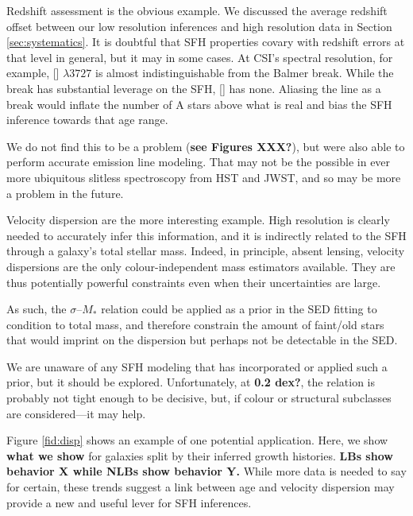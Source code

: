 \documentclass[a4paper,fleqn,usenatbib]{mnras}
\newcommand{\Mstel}{M_\ast}
\newcommand{\bfr}{\bf\color{red}}
\begin{document}
Redshift assessment is the obvious example. We discussed the average redshift offset between
our low resolution inferences and high resolution data in Section \ref{sec:systematics}. It is
doubtful that SFH properties covary with redshift errors at that level in general, but it may in 
some cases. At CSI's spectral resolution, for example, [] $\lambda 3727$ is 
almost indistinguishable from the Balmer break. While the break has substantial leverage 
on the SFH, [] has none. Aliasing the line as a break would inflate the number 
of A stars above what is real and bias the SFH inference towards that age range. 

We do not 
find this to be a problem ({\bfr see Figures XXX?}), but were also able to perform accurate
emission line modeling. That may not be the possible in ever more ubiquitous slitless 
spectroscopy from HST and JWST, and so may be more a problem in the future.

Velocity dispersion are the more interesting example. High resolution is clearly needed to
accurately infer this information, and it is indirectly related to the SFH through a galaxy's
total stellar mass. Indeed, in principle, absent lensing, velocity dispersions are the only
colour-independent mass estimators available. They are thus potentially powerful constraints
even when their uncertainties are large.

As such, the $\sigma$--$\Mstel$ relation could be applied as a prior in the SED fitting to 
condition to total mass, and therefore constrain the amount of faint/old 
stars that would imprint on the dispersion but perhaps not be detectable in the SED.

We are unaware of any SFH modeling that has incorporated or applied such a prior, but
it should be explored. Unfortunately, at {\bfr 0.2 dex?}, the relation is probably not tight 
enough to be decisive, but, if colour or structural subclasses are considered---it may help. 

Figure \ref{fid:disp} shows an example of one potential application. Here, we show {\bfr what 
we show} for galaxies split by their inferred growth histories. {\bfr LBs show behavior X while NLBs
show behavior Y.} While more data is needed to say for certain, these trends suggest a link
between age and velocity dispersion may provide a new and useful lever for SFH inferences.
\end{document}
